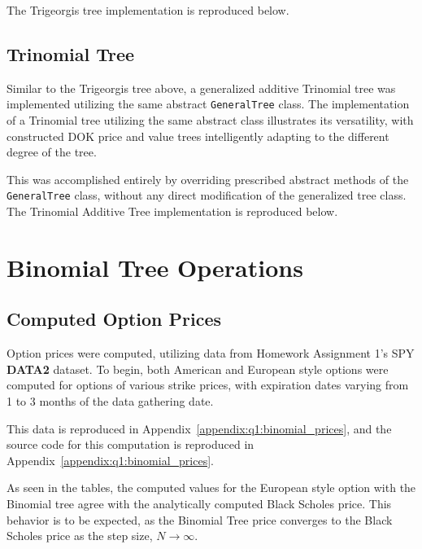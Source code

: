 \documentclass[10pt]{article}
\begin{document}
    The Trigeorgis tree implementation is reproduced below.

        

    \newpage
    \subsection{Trinomial Tree}

    
    Similar to the Trigeorgis tree above, a generalized additive Trinomial tree was implemented utilizing the same abstract \texttt{GeneralTree} class. The implementation of a Trinomial tree utilizing the same abstract class illustrates its versatility, with constructed DOK price and value trees intelligently adapting to the different degree of the tree.
    
    This was accomplished entirely by overriding prescribed abstract methods of the \texttt{GeneralTree} class, without any direct modification of the generalized tree class. The Trinomial Additive Tree implementation is reproduced below.

    
    
\newpage
\section{Binomial Tree Operations}

    \subsection{Computed Option Prices}

    Option prices were computed, utilizing data from Homework Assignment 1's SPY \textbf{DATA2} dataset. To begin, both American and European style options were computed for options of various strike prices, with expiration dates varying from 1 to 3 months of the data gathering date.

    This data is reproduced in Appendix~\ref{appendix:q1:binomial_prices}, and the source code for this computation is reproduced in Appendix~\ref{appendix:q1:binomial_prices}.

    As seen in the tables, the computed values for the European style option with the Binomial tree agree with the analytically computed Black Scholes price. This behavior is to be expected, as the Binomial Tree price converges to the Black Scholes price as the step size, $N \rightarrow \infty$.
\end{document}
